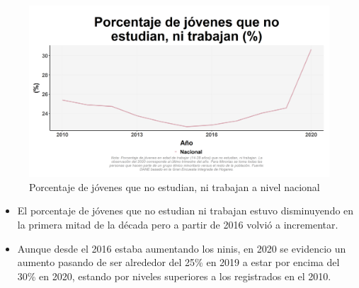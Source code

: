     \begin{figure}[H]
        \caption{Porcentaje de jóvenes que no estudian, ni trabajan a nivel nacional \label{map_result_2} }
        \begin{center}
        \includegraphics[width=\textwidth,keepaspectratio]{img/var_42_trend.png}
        \end{center}
    \end{figure}
            \begin{itemize}
                \item El porcentaje de jóvenes que no estudian ni trabajan estuvo disminuyendo en la primera mitad de la década pero a partir de 2016 volvió a incrementar.
                \item Aunque desde el 2016 estaba aumentando los ninis, en 2020 se evidencio un aumento pasando de ser alrededor del 25\% en 2019 a estar por encima del 30\% en 2020, estando por niveles superiores a los registrados en el 2010.
                \end{itemize}

